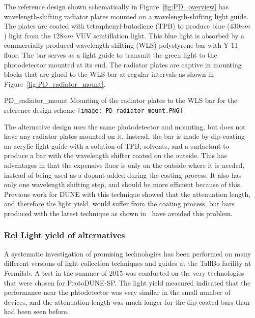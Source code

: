 The reference design shown schematically in Figure~\ref{fig:PD_overview}
has wavelength-shifting radiator plates mounted on a wavelength-shifting light guide.
The plates are coated 
with tetraphenyl-butadiene (TPB) to produce blue ($430nm$) light from the $128nm$ VUV 
scintillation light.  
This blue light is absorbed by a commercially produced wavelength shifting (WLS)
polystyrene bar with Y-11 fluor.  
The bar serves as a light guide to transmit the green light to the photodetector 
mounted at its end.
The radiator plates are captive in mounting blocks that are glued to the WLS bar
at regular intervals as shown in Figure~\ref{fig:PD_radiator_mount}.
\begin{cdrfigure}{PD_radiator_mount}
  {Mounting of the radiator plates to the WLS bar for the reference design scheme}
\texttt{[image: PD\_radiator\_mount.PNG]}
\end{cdrfigure}

The alternative design uses the same photodetector and mounting, but does not have
any radiator plates mounted on it.  
Instead, the bar is made by dip-coating an acrylic light guide with a solution
of TPB, solvents, and a surfactant to produce a bar with the wavelength shifter coated
on the outside.  
This has advantages in that the expensive fluor is only on the outside where it is
needed, instead of being used as a dopant added during the casting process.  
It also has only one wavelength shifting step, and should be more efficient because
of this.  
Previous work for DUNE with this technique showed that the attenuation length, and
therefore the light yield, would suffer from the coating process, but bars produced with
the latest technique as shown in~\cite{conrad_jinst} have %
avoided this problem.

\subsubsection{Rel Light yield of alternatives}

A systematic investigation of promising technologies has been performed on 
many different versions of light collection techniques and guides at the 
TallBo facility at Fermilab.
A test in the summer of 2015 was conducted on the very technologies that 
were chosen for ProtoDUNE-SP. \cite{TallBo4} %
The light yield measured indicated that the performance near the phtodetector
was very similar in the small number of devices, and the attenuation length
was much longer for the dip-coated bars than had been seen before. 

